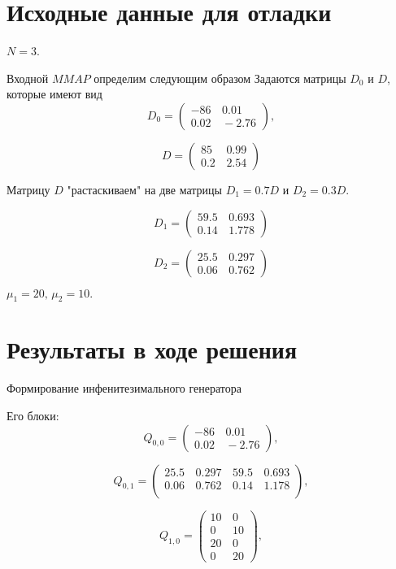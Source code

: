 \documentclass[12pt, a4paper]{article}
\begin{document}
\section{Исходные данные для отладки}

$N=3$.

Входной $MMAP$ определим следующим образом
Задаются  матрицы $D_0$ и $D$, которые  имеют вид
 $$
    D_0 = \left(\begin{array}{cc}
     -86 & \,0.01 \\
     0.02 & \,-2.76
    \end{array}\right),
   $$

    $$
    D = \left(\begin{array}{cc}
     85 & \,0.99 \\
     0.2 & \,2.54
\end{array}\right)
$$

Матрицу $D$ "растаскиваем"  на две матрицы $D_1 = 0.7 D$ и $D_2 =0.3 D.$

    $$
D_1 = \left(\begin{array}{cc}
59.5 & \,0.693 \\
0.14 & \,1.778
\end{array}\right)
$$

    $$
D_2 = \left(\begin{array}{cc}
25.5 & \,0.297 \\
0.06 & \,0.762
\end{array}\right)
$$

$\mu_1=20,\, \mu_2=10.$


\section{Результаты в ходе решения}

Формирование инфенитезимального генератора

Его блоки:
    $$
Q_{0,0} = \left(\begin{array}{cc}
     -86 & \,0.01 \\
0.02 & \,-2.76
\end{array}\right),
$$


$$
Q_{0,1} = \left(\begin{array}{cccc}
25.5 & \,0.297 & \,59.5 & \,0.693  \\
0.06 & \,0.762 & \,0.14 & \,1.178  \\
\end{array}\right),
$$

    $$
Q_{1,0} = \left(\begin{array}{cc}
10 & \,0 \\
0 & \,10 \\
20 & \,0 \\
0 & \,20
\end{array}\right),
$$
\end{document}
